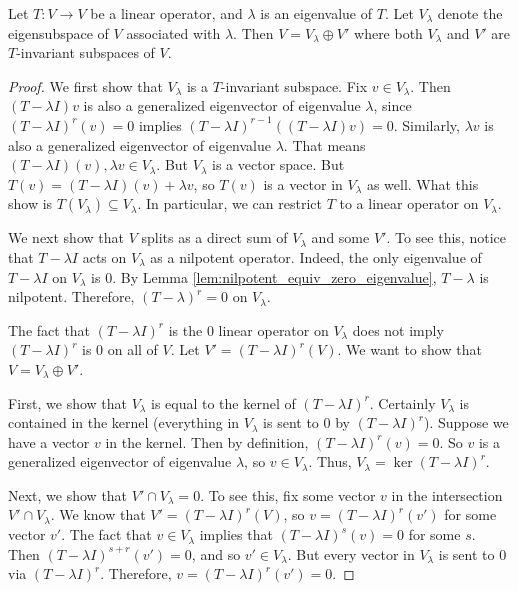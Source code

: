 \begin{lem}\label{lem:V_decomposes}
Let $T: V \to V$ be a linear operator, and $\lambda$ is an 
eigenvalue of $T$. Let $V_\lambda$ denote the eigensubspace of $V$ 
associated with $\lambda$. Then $V = V_\lambda \oplus V'$ where 
both $V_\lambda$ and $V'$ are $T$-invariant subspaces of $V$.
\end{lem}
\begin{proof}
We first show that $V_\lambda$ is a $T$-invariant subspace.
Fix $v \in V_\lambda$. Then $(T - \lambda I)v$ is also a generalized
eigenvector of eigenvalue $\lambda$, since $(T - \lambda I)^r(v) = 0$ implies
$(T - \lambda I)^{r - 1}((T - \lambda I)v) = 0$. Similarly, $\lambda v$
is also a generalized eigenvector of eigenvalue $\lambda$. That means
$(T - \lambda I)(v), \lambda v \in V_\lambda$. But $V_\lambda$ is a vector
space. But $T(v) = (T - \lambda I)(v) + \lambda v$, so $T(v)$ is a
vector in $V_\lambda$ as well. What this show is $T(V_\lambda)
\subseteq V_\lambda$. In particular, we can restrict $T$ to a linear
operator on $V_\lambda$.

We next show that $V$ splits as a direct sum of $V_\lambda$ and 
some $V'$. To see this, notice that $T - \lambda I$ acts on 
$V_\lambda$ as a nilpotent operator. Indeed, the only eigenvalue
of $T - \lambda I$ on $V_\lambda$ is $0$. By Lemma
\ref{lem:nilpotent_equiv_zero_eigenvalue}, $T - \lambda$ is
nilpotent. Therefore, $(T - \lambda)^r = 0$ on $V_\lambda$.

The fact that $(T - \lambda I)^r$ is the $0$ linear operator 
on $V_\lambda$ does not imply $(T - \lambda I)^r$ is $0$ on
all of $V$. Let $V' = (T - \lambda I)^r(V)$. We want to show that
$V = V_\lambda \oplus V'$. 

First, we show that $V_\lambda$ is equal to the kernel of $(T - \lambda I)^r$.
Certainly $V_\lambda$ is contained in the kernel (everything in
$V_\lambda$ is sent to 0 by $(T - \lambda I)^r$). Suppose we have
a vector $v$ in the kernel. Then by definition, $(T - \lambda I)^r(v)
= 0$. So $v$ is a generalized eigenvector of eigenvalue $\lambda$,
so $v \in V_\lambda$. Thus, $V_\lambda = \ker (T - \lambda I)^r$.

Next, we show that $V' \cap V_\lambda = 0$. To see this, fix some
vector $v$ in the intersection $V' \cap V_\lambda$. We know that
$V' = (T - \lambda I)^r(V)$, so $v = (T - \lambda I)^r(v')$ for
some vector $v'$. The fact that $v \in V_\lambda$ implies that
$(T - \lambda I)^s(v) = 0$ for some $s$. Then $(T - \lambda I)^{s + r}(v')
= 0$, and so $v' \in V_\lambda$. But every vector in $V_\lambda$
is sent to $0$ via $(T - \lambda I)^r$. Therefore, $v = (T - \lambda I)^r(v')
= 0$.


\end{proof}
